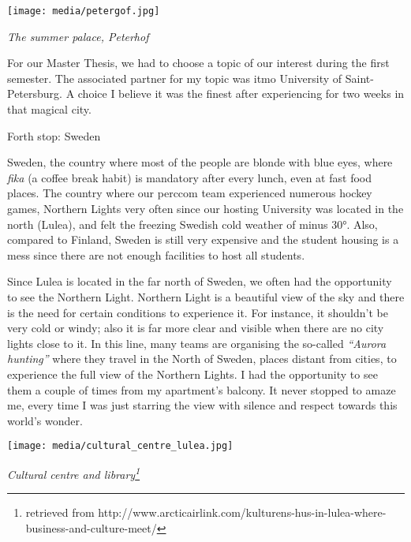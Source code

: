 \documentclass[10pt,a4paper]{article} %
\newcommand{\NewsItem}[1]{ %
\usefont{T1}{fvs}{n}{n} %
\vspace{24pt}\large #1\vspace{3pt} %
\par \normalsize \normalfont}
\begin{document}
\begin{multicols}{3}
\begin{center}
	\texttt{[image: media/petergof.jpg]}
	\par\textit{The summer palace, Peterhof}
\end{center}

For our Master Thesis, we had to choose a topic of our interest during the first 
semester. 
The associated partner for my topic was {\sc itmo} University of Saint-Petersburg. 
A choice I believe it was the finest after experiencing for two weeks in that 
magical city.

\NewsItem{Forth stop: Sweden}
Sweden, the country where most of the people are blonde with blue eyes, 
where \textit{fika} (a coffee break habit) is mandatory after every lunch, 
even at fast food places. 
The country where our {\sc perccom} team experienced numerous hockey games, Northern 
Lights very often since our hosting University was located in the north (Lulea), and 
felt the freezing Swedish cold weather of minus \ang{30}. 
Also, compared to Finland, Sweden is still very expensive and the student housing is 
a mess since there are not enough facilities to host all students. 

Since Lulea is located in the far north of Sweden, we often had the opportunity to 
see the Northern Light. 
Northern Light is a beautiful view of the sky and there is the need for certain
conditions to experience it. 
For instance, it shouldn't be very cold or windy; also it is far more clear and visible 
when there are no city lights close to it. 
In this line, many teams are organising the so-called \textit{``Aurora hunting''} 
where they travel in the North of Sweden, places distant from cities, to experience 
the full view of the Northern Lights. 
I had the opportunity to see them a couple of times from my apartment's balcony. 
It never stopped to amaze me, every time I was just starring the view with silence 
and respect towards this world's wonder.

\begin{center}
	\texttt{[image: media/cultural\_centre\_lulea.jpg]}
	\par\textit{Cultural centre and library\footnote{retrieved from http://www.arcticairlink.com/kulturens-hus-in-lulea-where-business-and-culture-meet/}}
\end{center}


\end{multicols}
\end{document}
